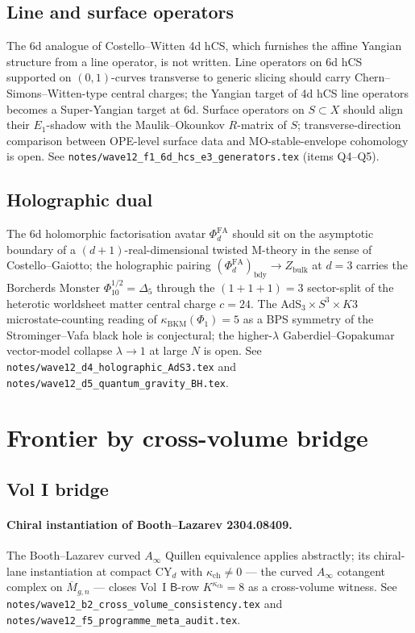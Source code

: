 \documentclass[11pt]{article}
\providecommand{\kch}{\kappa_{\mathrm{ch}}}
\providecommand{\kBKM}{\kappa_{\mathrm{BKM}}}
\providecommand{\Eone}{E_1}
\providecommand{\Phifa}{\Phi^{\mathrm{FA}}}
\begin{document}
\subsection{Line and surface operators}

The 6d analogue of Costello--Witten 4d hCS, which furnishes the
affine Yangian structure from a line operator, is not written. Line
operators on 6d hCS supported on $(0, 1)$-curves transverse to
generic slicing should carry Chern--Simons--Witten-type central
charges; the Yangian target of 4d hCS line operators becomes a
Super-Yangian target at 6d. Surface operators on $S \subset X$ should
align their $\Eone$-shadow with the Maulik--Okounkov $R$-matrix of
$S$; transverse-direction comparison between OPE-level surface data
and MO-stable-envelope cohomology is open. See
\texttt{notes/wave12\_f1\_6d\_hcs\_e3\_generators.tex} (items
Q4--Q5).

\subsection{Holographic dual}

The 6d holomorphic factorisation avatar $\Phifa_d$ should sit on the
asymptotic boundary of a $(d + 1)$-real-dimensional twisted
M-theory in the sense of Costello--Gaiotto; the holographic pairing
$(\Phifa_d)_{\mathrm{bdy}} \to Z_{\mathrm{bulk}}$ at
$d = 3$ carries the Borcherds Monster $\Phi_{10}^{1/2} = \Delta_5$
through the $(1+1+1) = 3$ sector-split of the heterotic worldsheet
matter central charge $c = 24$. The AdS$_3 \times S^3 \times K3$
microstate-counting reading of $\kBKM(\Phi_1) = 5$ as a BPS symmetry
of the Strominger--Vafa black hole is conjectural; the
higher-$\lambda$ Gaberdiel--Gopakumar vector-model collapse
$\lambda \to 1$ at large $N$ is open. See
\texttt{notes/wave12\_d4\_holographic\_AdS3.tex} and
\texttt{notes/wave12\_d5\_quantum\_gravity\_BH.tex}.

\section{Frontier by cross-volume bridge}

\subsection{Vol I bridge}

\paragraph{Chiral instantiation of Booth--Lazarev 2304.08409.} The
Booth--Lazarev curved $A_\infty$ Quillen equivalence applies
abstractly; its chiral-lane instantiation at compact CY$_d$ with
$\kch \neq 0$ --- the curved $A_\infty$ cotangent complex on
$\overline{M}_{g, n}$ --- closes Vol~I $\mathsf{B}$-row
$K^{\kch} = 8$ as a cross-volume witness. See
\texttt{notes/wave12\_b2\_cross\_volume\_consistency.tex} and
\texttt{notes/wave12\_f5\_programme\_meta\_audit.tex}.
\end{document}

